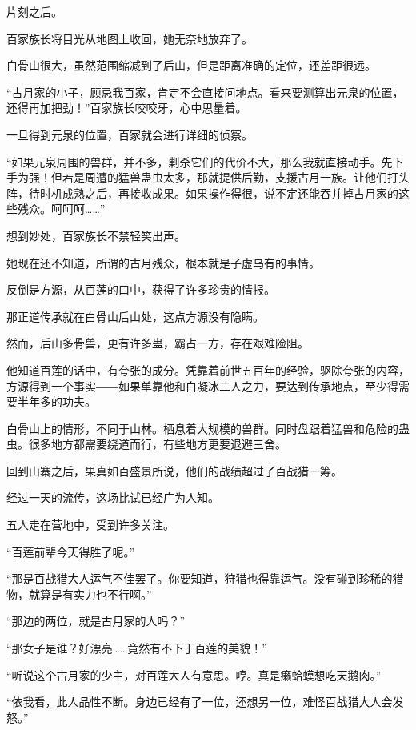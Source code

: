 
\begin{this_body}

片刻之后。

百家族长将目光从地图上收回，她无奈地放弃了。

白骨山很大，虽然范围缩减到了后山，但是距离准确的定位，还差距很远。

“古月家的小子，顾忌我百家，肯定不会直接问地点。看来要测算出元泉的位置，还得再加把劲！”百家族长咬咬牙，心中思量着。

一旦得到元泉的位置，百家就会进行详细的侦察。

“如果元泉周围的兽群，并不多，剿杀它们的代价不大，那么我就直接动手。先下手为强！但若是周遭的猛兽蛊虫太多，那就提供后勤，支援古月一族。让他们打头阵，待时机成熟之后，再接收成果。如果操作得很，说不定还能吞并掉古月家的这些残众。呵呵呵……”

想到妙处，百家族长不禁轻笑出声。

她现在还不知道，所谓的古月残众，根本就是子虚乌有的事情。

反倒是方源，从百莲的口中，获得了许多珍贵的情报。

那正道传承就在白骨山后山处，这点方源没有隐瞒。

然而，后山多骨兽，更有许多蛊，霸占一方，存在艰难险阻。

他知道百莲的话中，有夸张的成分。凭靠着前世五百年的经验，驱除夸张的内容，方源得到一个事实――如果单靠他和白凝冰二人之力，要达到传承地点，至少得需要半年多的功夫。

白骨山上的情形，不同于山林。栖息着大规模的兽群。同时盘踞着猛兽和危险的蛊虫。很多地方都需要绕道而行，有些地方更要退避三舍。

回到山寨之后，果真如百盛景所说，他们的战绩超过了百战猎一筹。

经过一天的流传，这场比试已经广为人知。

五人走在营地中，受到许多关注。

“百莲前辈今天得胜了呢。”

“那是百战猎大人运气不佳罢了。你要知道，狩猎也得靠运气。没有碰到珍稀的猎物，就算是有实力也不行啊。”

“那边的两位，就是古月家的人吗？”

“那女子是谁？好漂亮……竟然有不下于百莲的美貌！”

“听说这个古月家的少主，对百莲大人有意思。哼。真是癞蛤蟆想吃天鹅肉。”

“依我看，此人品性不断。身边已经有了一位，还想另一位，难怪百战猎大人会发怒。”


\end{this_body}
